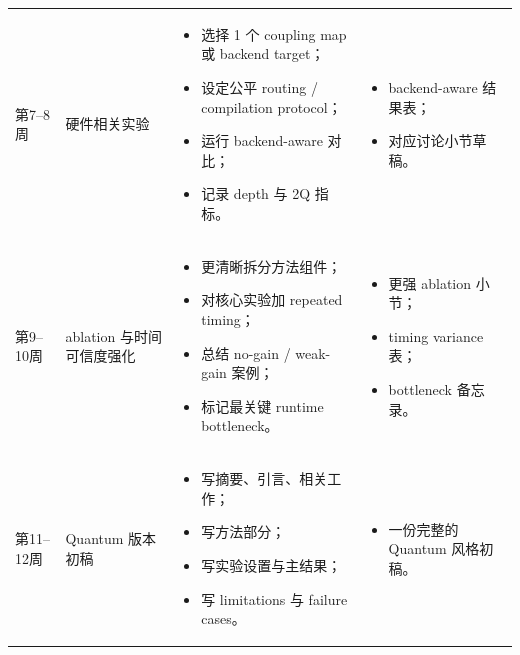 \documentclass[11pt]{article}
\begin{document}
\begin{longtable}{p{} p{} p{} p{}}
第7--8周 &
硬件相关实验 &
\begin{itemize}
    \item 选择 1 个 coupling map 或 backend target；
    \item 设定公平 routing / compilation protocol；
    \item 运行 backend-aware 对比；
    \item 记录 depth 与 2Q 指标。
\end{itemize}
&
\begin{itemize}
    \item backend-aware 结果表；
    \item 对应讨论小节草稿。
\end{itemize}
\\

第9--10周 &
ablation 与时间可信度强化 &
\begin{itemize}
    \item 更清晰拆分方法组件；
    \item 对核心实验加 repeated timing；
    \item 总结 no-gain / weak-gain 案例；
    \item 标记最关键 runtime bottleneck。
\end{itemize}
&
\begin{itemize} 
    \item 更强 ablation 小节；
    \item timing variance 表；
    \item bottleneck 备忘录。
\end{itemize}
\\

第11--12周 &
Quantum 版本初稿 &
\begin{itemize}
    \item 写摘要、引言、相关工作；
    \item 写方法部分；
    \item 写实验设置与主结果；
    \item 写 limitations 与 failure cases。
\end{itemize}
&
\begin{itemize}
    \item 一份完整的 Quantum 风格初稿。
\end{itemize}
\\


\end{longtable}
\end{document}
